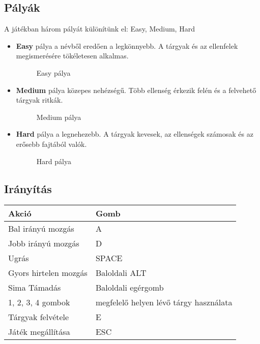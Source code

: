 \begin{enumerate}
\end{enumerate}

\subsection{Pályák}
A játékban három pályát különítünk el: Easy, Medium, Hard

\begin{itemize}
	\item \textbf{Easy} pálya a névből eredően a legkönnyebb. A tárgyak és az ellenfelek megismerésére tökéletesen alkalmas.
	\begin{figure}[H]
		\noindent{}
		\caption{Easy pálya}
	\end{figure}
		\cleardoublepage
		\item \textbf{Medium} pálya közepes nehézségű. Több ellenség érkezik felén és a felvehető tárgyak ritkák.
	\begin{figure}[H]
		\noindent{}
		\caption{Medium pálya}
	\end{figure}
	
		\item \textbf{Hard} pálya a legnehezebb. A tárgyak kevesek, az ellenségek számosak és az erősebb fajtából valók.
	\begin{figure}[H]
		\noindent{}
		\caption{Hard pálya}
	\end{figure}
\end{itemize}

\subsection{Irányítás}
\begin{table}[H]
	\centering
	\begin{tabular}{ | m{} | m{} | }
		\hline
		\textbf{Akció} & \textbf{Gomb} \\
		\hline \hline
		Bal irányú mozgás & A \\ \hline
		Jobb irányú mozgás & D \\ \hline
		Ugrás & SPACE \\ \hline
		Gyors hirtelen mozgás & Baloldali ALT \\ \hline
		Sima Támadás & Baloldali egérgomb \\ \hline
		1, 2, 3, 4 gombok & megfelelő helyen lévő tárgy használata \\ \hline
		Tárgyak felvétele & E \\ \hline
		Játék megállítása & ESC \\ \hline
	\end{tabular}
	\label{instruc}
\end{table}

